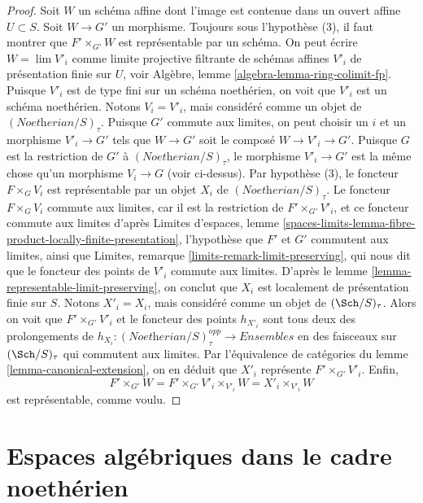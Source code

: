 \begin{proof}
\medskip\noindent
Soit $W$ un schéma affine dont l'image est contenue dans un ouvert affine $U \subset S$.
Soit $W \to G'$ un morphisme.
Toujours sous l'hypothèse (3), il faut montrer que $F' \times_{G'} W$
est représentable par un schéma.
On peut écrire $W = \lim V'_i$ comme limite projective filtrante de schémas
affines $V'_i$ de présentation finie sur $U$, voir
Algèbre, lemme \ref{algebra-lemma-ring-colimit-fp}.
Puisque $V'_i$ est de type fini sur un schéma noethérien,
on voit que $V'_i$ est un schéma noethérien.
Notons $V_i = V'_i$, mais considéré comme un objet de
$(\textit{Noetherian}/S)_\tau$. Puisque $G'$
commute aux limites, on peut choisir un $i$ et un morphisme
$V'_i \to G'$ tels que $W \to G'$ soit le composé
$W \to V'_i \to G'$. Puisque $G$ est la restriction de $G'$
à $(\textit{Noetherian}/S)_\tau$, le morphisme $V'_i \to G'$
est la même chose qu'un morphisme $V_i \to G$ (voir ci-dessus).
Par hypothèse (3), le foncteur $F \times_G V_i$ est représentable par un objet
$X_i$ de $(\textit{Noetherian}/S)_\tau$.
Le foncteur $F \times_G V_i$ commute aux limites,
car il est la restriction de $F' \times_{G'} V'_i$,
et ce foncteur commute aux limites d'après
Limites d'espaces, lemme
\ref{spaces-limits-lemma-fibre-product-locally-finite-presentation},
l'hypothèse que $F'$ et $G'$ commutent aux limites, ainsi que
Limites, remarque \ref{limits-remark-limit-preserving}, qui
nous dit que le foncteur des points de $V'_i$ commute aux limites.
D'après le lemme \ref{lemma-representable-limit-preserving},
on conclut que $X_i$ est localement de présentation finie sur $S$.
Notons $X'_i = X_i$, mais considéré comme un objet de
$(\Sch/S)_\tau$. Alors on voit que $F' \times_{G'} V'_i$
et le foncteur des points $h_{X'_i}$ sont tous deux des prolongements
de $h_{X_i} : (\textit{Noetherian}/S)_\tau^{opp} \to \textit{Ensembles}$
en des faisceaux sur $(\Sch/S)_\tau$ qui commutent aux limites.
Par l'équivalence de catégories du lemme \ref{lemma-canonical-extension},
on en déduit que $X'_i$ représente $F' \times_{G'} V'_i$.
Enfin,
$$
F' \times_{G'} W = F' \times_{G'} V'_i \times_{V'_i} W =
X'_i \times_{V'_i} W
$$
est représentable, comme voulu.
\end{proof}






\section{Espaces algébriques dans le cadre noethérien}
\label{section-algebraic-spaces-noetherian}

